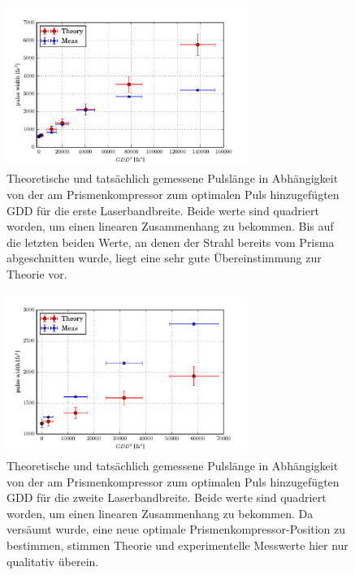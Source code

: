 \documentclass[twoside,        %
               BCOR12mm,       %
               english,ngerman, %
               fleqn,headsepline=false,footsepline=false
              ]{Vorlage/MFPREPORT}
\begin{document}
\begin{figure}[]
    \begin{center}
        \includegraphics[width=0.7\textwidth]{Eric/prismcomp}
    \end{center}
    \caption{Theoretische und tatsächlich gemessene Pulslänge in Abhängigkeit
    von der am Prismenkompressor zum optimalen Puls hinzugefügten GDD für die
    erste Laserbandbreite. Beide werte sind quadriert worden, um einen linearen Zusammenhang zu bekommen.
    Bis auf die letzten beiden Werte, an denen der Strahl bereits vom Prisma
    abgeschnitten wurde, liegt eine sehr gute Übereinstimmung zur Theorie vor.}
    \label{fig:pckieran1}
\end{figure}
\begin{figure}[]
    \begin{center}
        \includegraphics[width=0.7\textwidth]{Eric/prismcomp2}
    \end{center}
    \caption{Theoretische und tatsächlich gemessene Pulslänge in Abhängigkeit
    von der am Prismenkompressor zum optimalen Puls hinzugefügten GDD für die
    zweite Laserbandbreite. Beide werte sind quadriert worden, um einen linearen
    Zusammenhang zu bekommen. Da versäumt wurde, eine neue optimale
    Prismenkompressor-Position zu bestimmen, stimmen Theorie und experimentelle
    Messwerte hier nur qualitativ überein.}
    \label{fig:pckieran2}
\end{figure}
\end{document}
